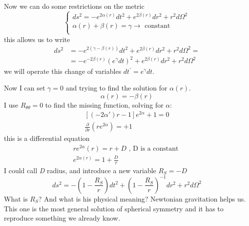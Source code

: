 Now we can do some restrictions on the metric
\begin{equation}
\begin{cases}
ds^{2} = -e ^{2\alpha \left( r \right)}dt^{2} + e^{2\beta \left( r \right)} dr^{2} + r^{2} d\Omega ^{2} \\
 \alpha \left( r  \right) + \beta \left( r \right) = \gamma \to  \text{ constant }\\
\end{cases}
\end{equation}
this allows us to write
\begin{align}
	ds^{2} &= -e^{2\left( \gamma  - \beta \left( r \right) \right)} dt^{2} + e^{2\beta \left( r \right)} dr^{2} + r^{2} d\Omega^{2} = \\
	       & = -e ^{-2\beta \left( r \right)} \left( e^{\gamma }dt \right)^{2} + e^{2\beta\left( r \right) }dr^{2} + r^{2} d\Omega ^{2}  
\end{align}
we will operate this change of variables $dt^{\prime } = e^{\gamma }dt$.\par
Now I can set $\gamma =0$ and trying to find the solution for $\alpha \left( r \right)$.
\[
\alpha \left( r \right) = - \beta \left( r \right)
\]
I use $R_{\theta \theta } = 0$ to find the missing function, solving for $\alpha $:
\begin{gather*}
	\left[ \left( -2\alpha \prime  \right)r-1\right]e^{2\alpha }+1 = 0 \\
	\frac{\partial }{\partial r} \left( re^{2\alpha } \right) = +1
\end{gather*}
this is a differential equation 
\begin{gather*}
re^{2\alpha }\left( r \right) = r + D \text{ , D is a constant } \\
e^{2\alpha \left( r \right)} = 1 + \frac{D}{r}
\end{gather*}
I could call \emph{D} radius, and introduce a new variable $R_{S} = - D$
\begin{equation}
ds^{2} = - \left( 1- \frac{R_{S}}{r} \right)dt^{2} + \left( 1 - \frac{R_{S}}{r} \right)^{-1} dr^{2} + r^{2}d\Omega ^{2}
\end{equation}
What is $R_{S}$? And what is his physical meaning? Newtonian gravitation helps us. This one is the most  general solution of spherical symmetry and it has to reproduce something we already know.\par

